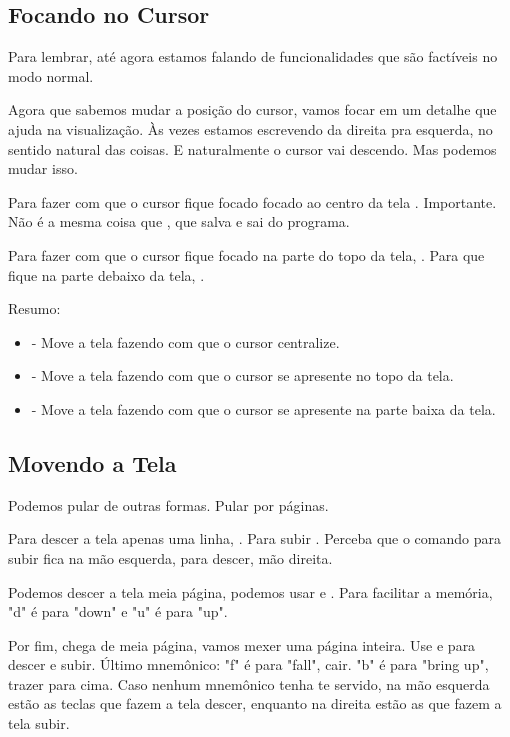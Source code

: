 \subsection{Focando no Cursor}
Para lembrar, até agora estamos falando de funcionalidades que são factíveis no modo normal.

Agora que sabemos mudar a posição do cursor, vamos focar em um detalhe que ajuda na visualização.
Às vezes estamos escrevendo da direita pra esquerda, no sentido natural das coisas.
E naturalmente o cursor vai descendo.
Mas podemos mudar isso.

Para fazer com que o cursor fique focado focado ao centro da tela .
Importante. Não é a mesma coisa que , que salva e sai do programa.

Para fazer com que o cursor fique focado na parte do topo da tela, .
Para que fique na parte debaixo da tela, .

Resumo:
\begin{itemize}
    \item {} - Move a tela fazendo com que o cursor centralize.
    \item {} - Move a tela fazendo com que o cursor se apresente no topo da tela.
    \item {} - Move a tela fazendo com que o cursor se apresente na parte baixa da tela.
\end{itemize}

\subsection{Movendo a Tela}
Podemos pular de outras formas. Pular por páginas.

Para descer a tela apenas uma linha, . Para subir .
Perceba que o comando para subir fica na mão esquerda, para descer, mão direita.

Podemos descer a tela meia página, podemos usar  e .
Para facilitar a memória, "d" é para "down" e "u" é para "up".

Por fim, chega de meia página, vamos mexer uma página inteira.
Use  e  para descer e subir.
Último mnemônico: "f" é para "fall", cair.
"b" é para "bring up", trazer para cima.
Caso nenhum mnemônico tenha te servido,
na mão esquerda estão as teclas que fazem a tela descer,
enquanto na direita estão as que fazem a tela subir.

